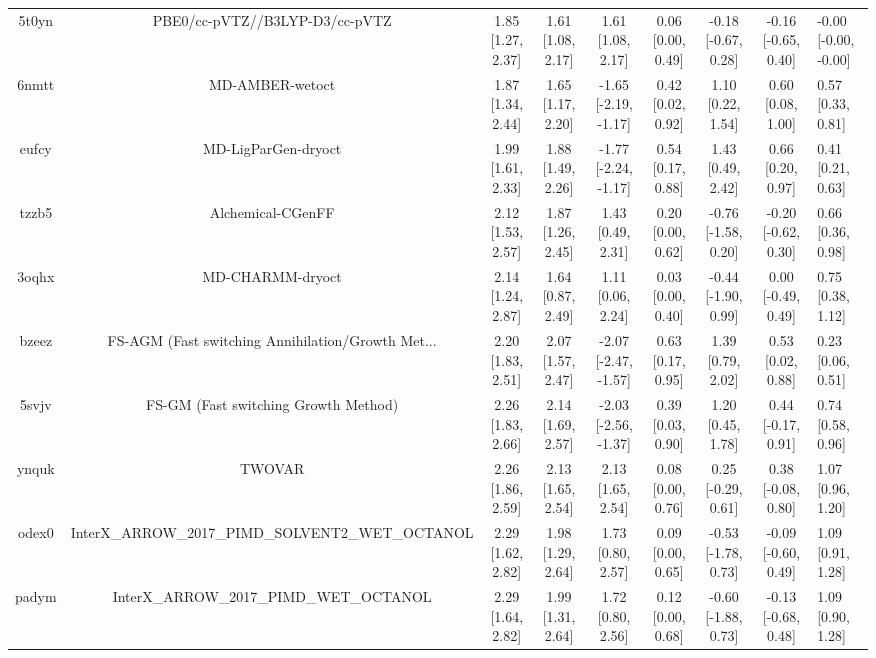 \documentclass{article}
\begin{document}
\begin{center}
\begin{longtable}{|cccccccc|}
 5t0yn &                     PBE0/cc-pVTZ//B3LYP-D3/cc-pVTZ &  1.85 [1.27, 2.37] &  1.61 [1.08, 2.17] &     1.61 [1.08, 2.17] &  0.06 [0.00, 0.49] &  -0.18 [-0.67, 0.28] &  -0.16 [-0.65, 0.40] &  -0.00 [-0.00, -0.00] \\
 6nmtt &                                    MD-AMBER-wetoct &  1.87 [1.34, 2.44] &  1.65 [1.17, 2.20] &  -1.65 [-2.19, -1.17] &  0.42 [0.02, 0.92] &    1.10 [0.22, 1.54] &    0.60 [0.08, 1.00] &     0.57 [0.33, 0.81] \\
 eufcy &                                MD-LigParGen-dryoct &  1.99 [1.61, 2.33] &  1.88 [1.49, 2.26] &  -1.77 [-2.24, -1.17] &  0.54 [0.17, 0.88] &    1.43 [0.49, 2.42] &    0.66 [0.20, 0.97] &     0.41 [0.21, 0.63] \\
 tzzb5 &                                  Alchemical-CGenFF &  2.12 [1.53, 2.57] &  1.87 [1.26, 2.45] &     1.43 [0.49, 2.31] &  0.20 [0.00, 0.62] &  -0.76 [-1.58, 0.20] &  -0.20 [-0.62, 0.30] &     0.66 [0.36, 0.98] \\
 3oqhx &                                   MD-CHARMM-dryoct &  2.14 [1.24, 2.87] &  1.64 [0.87, 2.49] &     1.11 [0.06, 2.24] &  0.03 [0.00, 0.40] &  -0.44 [-1.90, 0.99] &   0.00 [-0.49, 0.49] &     0.75 [0.38, 1.12] \\
 bzeez &  FS-AGM (Fast switching Annihilation/Growth Met... &  2.20 [1.83, 2.51] &  2.07 [1.57, 2.47] &  -2.07 [-2.47, -1.57] &  0.63 [0.17, 0.95] &    1.39 [0.79, 2.02] &    0.53 [0.02, 0.88] &     0.23 [0.06, 0.51] \\
 5svjv &               FS-GM (Fast switching Growth Method) &  2.26 [1.83, 2.66] &  2.14 [1.69, 2.57] &  -2.03 [-2.56, -1.37] &  0.39 [0.03, 0.90] &    1.20 [0.45, 1.78] &   0.44 [-0.17, 0.91] &     0.74 [0.58, 0.96] \\
 ynquk &                                             TWOVAR &  2.26 [1.86, 2.59] &  2.13 [1.65, 2.54] &     2.13 [1.65, 2.54] &  0.08 [0.00, 0.76] &   0.25 [-0.29, 0.61] &   0.38 [-0.08, 0.80] &     1.07 [0.96, 1.20] \\
 odex0 &  InterX\_ARROW\_2017\_PIMD\_SOLVENT2\_WET\_OCTANOL &  2.29 [1.62, 2.82] &  1.98 [1.29, 2.64] &     1.73 [0.80, 2.57] &  0.09 [0.00, 0.65] &  -0.53 [-1.78, 0.73] &  -0.09 [-0.60, 0.49] &     1.09 [0.91, 1.28] \\
 padym &            InterX\_ARROW\_2017\_PIMD\_WET\_OCTANOL &  2.29 [1.64, 2.82] &  1.99 [1.31, 2.64] &     1.72 [0.80, 2.56] &  0.12 [0.00, 0.68] &  -0.60 [-1.88, 0.73] &  -0.13 [-0.68, 0.48] &     1.09 [0.90, 1.28] \\

\end{longtable}
\end{center}
\end{document}
